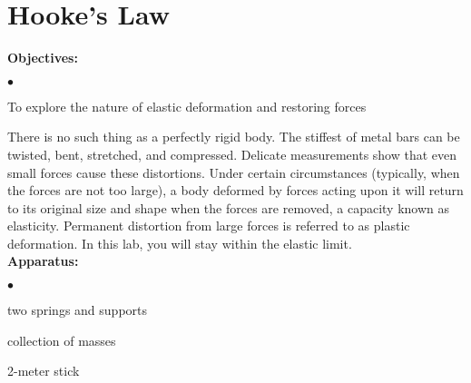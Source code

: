 
\section{Hooke's Law}

\makelabheader %

{\noindent \bf Objectives:} \begin{list}{$\bullet$}{\itemsep0pt }

\item To explore the nature of elastic deformation and restoring forces

\end{list}


There is no such thing as a perfectly rigid body. The stiffest of metal bars can be twisted, bent, stretched, and compressed. Delicate measurements show that even small forces cause these distortions. Under certain circumstances (typically, when the forces are not too large), a body deformed by forces acting upon it will return to its original size and shape when the forces are removed, a capacity known as elasticity. Permanent distortion from large forces is referred to as plastic deformation. In this lab, you will stay within the elastic limit. \\

{\noindent \bf Apparatus:} \begin{list}{$\bullet$}{\itemsep0pt }

\item two springs and supports \item collection of masses \item 2-meter stick

\end{list}

